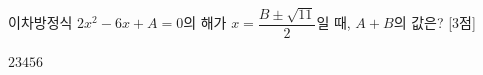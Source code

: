 이차방정식 $2x^2-6x+A=0$의 해가 $x=\dfrac{B\pm\sqrt{11}}{2}$일 때, $A+B$의 값은?  \mbox{[3점]}
\begin{choices32}{$2$}{$3$}{$4$}{$5$}{$6$}\end{choices32}

